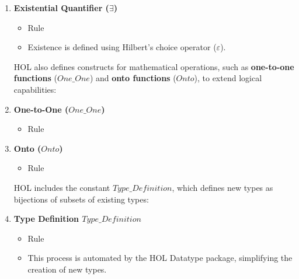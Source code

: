 \begin{enumerate}
    \item \textbf{Existential Quantifier ($\exists$)}
    \begin{itemize}
        \item Rule
        \item Existence is defined using Hilbert’s choice operator ($\varepsilon$).
    \end{itemize}

HOL also defines constructs for mathematical operations, such as \textbf{one-to-one functions} ($One\_One$) and \textbf{onto functions} ($Onto$), to extend logical capabilities:

    \item \textbf{One-to-One ($One\_One$)}
    \begin{itemize}
        \item Rule
    \end{itemize}

    \item \textbf{Onto ($Onto$)}
    \begin{itemize}
        \item Rule
    \end{itemize}

HOL includes the constant $Type\_Definition$, which defines new types as bijections of subsets of existing types:
    \item \textbf{Type Definition $Type\_Definition$}
    \begin{itemize}
        \item Rule
        \item This process is automated by the HOL Datatype package, simplifying the creation of new types.

    \end{itemize}


\end{enumerate}

